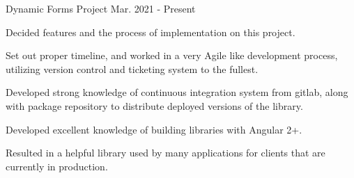 

\begin{cventries}

  \cventry
    {Dynamic Forms Project} %
    {} %
    {} %
    {Mar. 2021 - Present} %
    {
      \begin{cvitems} %
        \item {Decided features and the process of implementation on this project.}
        \item {Set out proper timeline, and worked in a very Agile like development process, utilizing version control and ticketing system to the fullest.}
        \item {Developed strong knowledge of continuous integration system from gitlab, along with package repository to distribute deployed versions of the library.}
        \item {Developed excellent knowledge of building libraries with Angular 2+.}
        \item {Resulted in a helpful library used by many applications for clients that are currently in production.}
      \end{cvitems}
    }
\end{cventries}
